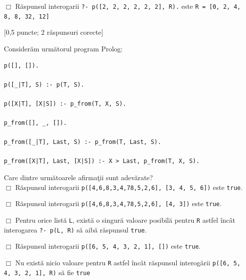 \documentclass[12pt]{article}
\newcommand{\probex}{\stepcounter{uebno}{\vspace{0.3cm}\noindent \bf (P\arabic{uebno}) }}
\renewcommand{\boxtimes}{\Box}
\begin{document}
$\boxtimes$ R\u{a}spunsul interogarii \texttt{?- p([2, 2, 2, 2, 2, 2], R).} este \texttt{R = [0, 2, 4, 8, 8, 32, 12]}

\probex [0,5 puncte; 2 r\u{a}spunsuri corecte]

Consider\u{a}m urm\u{a}torul program Prolog: 
\begin{verbatim}
p([], []).

p([_|T], S) :- p(T, S).

p([X|T], [X|S]) :- p_from(T, X, S).

p_from([], _, []).

p_from([_|T], Last, S) :- p_from(T, Last, S).

p_from([X|T], Last, [X|S]) :- X > Last, p_from(T, X, S).
\end{verbatim}
Care dintre urm\u{a}toarele afirma\c{t}ii sunt adev\u{a}rate? \\ 
$\boxtimes$ R\u{a}spunsul interogarii \texttt{p([4,6,8,3,4,78,5,2,6], [3, 4, 5, 6])} este \texttt{true}.

$\Box$ R\u{a}spunsul interogarii \texttt{p([4,6,8,3,4,78,5,2,6], [4, 3])} este \texttt{true}.

$\Box$ Pentru orice list\u{a} \texttt{L}, exist\u{a} o singur\u{a} valoare posibil\u{a} pentru \texttt{R} 
astfel \^{i}nc\^{a}t interogarea \texttt{?- p(L, R)} s\u{a} aib\u{a} r\u{a}spunsul \texttt{true}. 

$\boxtimes$ R\u{a}spunsul interogarii \texttt{p([6, 5, 4, 3, 2, 1], [])} este \texttt{true}. 

$\Box$ Nu exist\u{a} nicio valoare pentru \texttt{R} astfel \^{i}nc\^{a}t 
r\u{a}spunsul interog\u{a}rii \texttt{p([6, 5, 4, 3, 2, 1], R)} s\u{a} fie \texttt{true}
\end{document}
